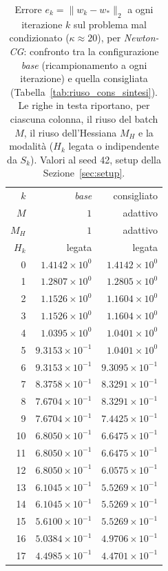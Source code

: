 \begin{table}[H]
\centering
\footnotesize
\renewcommand{\arraystretch}{0.85}
\setlength{\tabcolsep}{8pt}
\caption{Errore $e_k=\|w_k-w_*\|_2$ a ogni iterazione $k$ sul problema mal condizionato ($\kappa\approx 20$), per \emph{Newton-CG}: confronto tra la configurazione \emph{base} (ricampionamento a ogni iterazione) e quella consigliata (Tabella~\ref{tab:riuso_cons_sintesi}). Le righe in testa riportano, per ciascuna colonna, il riuso del batch $M$, il riuso dell'Hessiana $M_H$ e la modalità ($H_k$ legata o indipendente da $S_k$). Valori al seed 42, setup della Sezione~\ref{sec:setup}.}
\label{tab:riuso_cons_malcond_ncg}
\begin{tabular}{@{}rrr@{}}
\toprule
$k$ & \emph{base} & consigliato\\
$M$ & $1$ & adattivo\\
$M_H$ & $1$ & adattivo\\
$H_k$ & legata & legata\\
\midrule
0 & $1.4142\times10^{0}$ & $1.4142\times10^{0}$\\
1 & $1.2807\times10^{0}$ & $1.2805\times10^{0}$\\
2 & $1.1526\times10^{0}$ & $1.1604\times10^{0}$\\
3 & $1.1526\times10^{0}$ & $1.1604\times10^{0}$\\
4 & $1.0395\times10^{0}$ & $1.0401\times10^{0}$\\
5 & $9.3153\times10^{-1}$ & $1.0401\times10^{0}$\\
6 & $9.3153\times10^{-1}$ & $9.3095\times10^{-1}$\\
7 & $8.3758\times10^{-1}$ & $8.3291\times10^{-1}$\\
8 & $7.6704\times10^{-1}$ & $8.3291\times10^{-1}$\\
9 & $7.6704\times10^{-1}$ & $7.4425\times10^{-1}$\\
10 & $6.8050\times10^{-1}$ & $6.6475\times10^{-1}$\\
11 & $6.8050\times10^{-1}$ & $6.6475\times10^{-1}$\\
12 & $6.8050\times10^{-1}$ & $6.0575\times10^{-1}$\\
13 & $6.1045\times10^{-1}$ & $5.5269\times10^{-1}$\\
14 & $6.1045\times10^{-1}$ & $5.5269\times10^{-1}$\\
15 & $5.6100\times10^{-1}$ & $5.5269\times10^{-1}$\\
16 & $5.0384\times10^{-1}$ & $4.9706\times10^{-1}$\\
17 & $4.4985\times10^{-1}$ & $4.4701\times10^{-1}$\\

\end{tabular}
\end{table}
